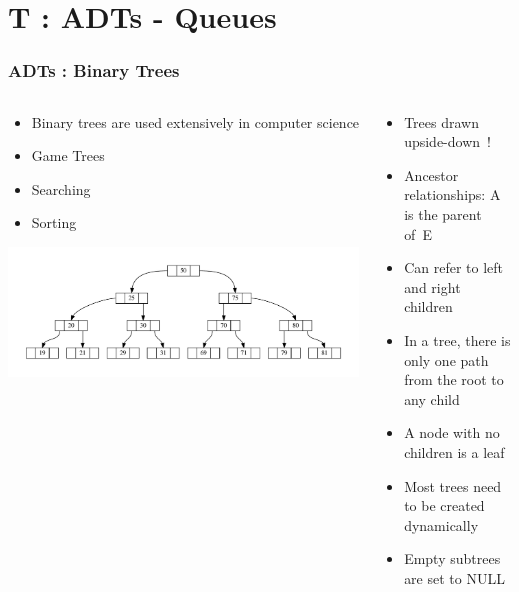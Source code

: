 \section{T : ADTs - Queues}
\label{chap:adts_trees}


\begin{frame}[fragile]
\frametitle{ADTs : Binary Trees}
\begin{columns}[T]

\begin{column}{0.45\textwidth}
\begin{itemize}[<+->]
\item Binary trees are used extensively in computer science	
\item Game Trees	
\item Searching	
\item Sorting	
\end{itemize}	
\pause
\begin{center}
\includegraphics[width=\textwidth]{../Images/Linkedb.pdf}	
\end{center}
\end{column}

\pause
\begin{column}{0.45\textwidth}
\begin{itemize}[<+->]
\item Trees drawn upside-down~!
\item Ancestor relationships: A is the parent of~E
\item Can refer to left and right children
\item In a tree, there is only one path from the root to any child
\item A node with no children is a leaf
\item Most trees need to be created dynamically
\item Empty subtrees are set to NULL
\end{itemize}
\end{column}

\end{columns}
\end{frame}

